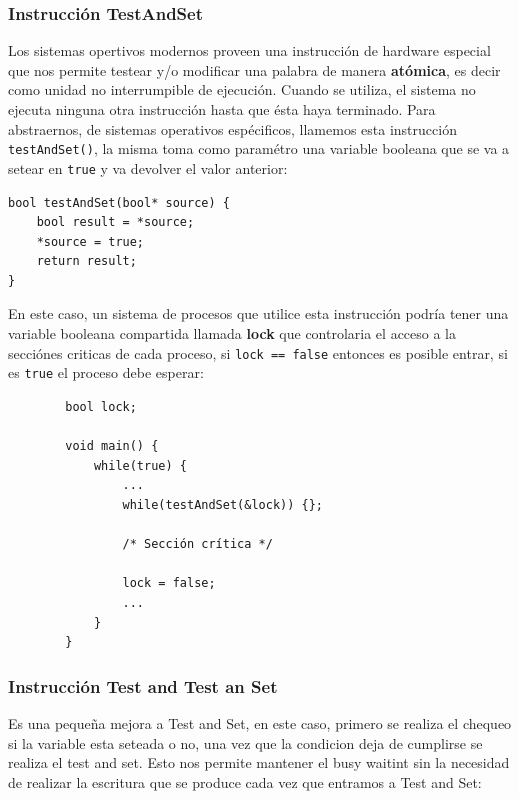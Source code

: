 \subsubsection{Instrucción TestAndSet}
Los sistemas opertivos modernos proveen una instrucción de hardware especial que nos permite testear y/o modificar una palabra de manera \textbf{atómica}, es decir como unidad no interrumpible de ejecución. Cuando se utiliza, el sistema no ejecuta ninguna otra instrucción hasta que ésta haya terminado. Para abstraernos, de sistemas operativos espécificos, llamemos esta instrucción \texttt{testAndSet()}, la misma toma como paramétro una variable booleana que se va a setear en \texttt{true} y va devolver el valor anterior:

\begin{center}
    \begin{minipage}{0.5\textwidth}
        \begin{verbatim}
bool testAndSet(bool* source) {
    bool result = *source;
    *source = true;
    return result;
}
        \end{verbatim}
    \end{minipage}
\end{center}

En este caso, un sistema de procesos que utilice esta instrucción podría tener una variable booleana compartida llamada \textbf{lock} que controlaria el acceso a la secciónes criticas de cada proceso, si \texttt{lock == false} entonces es posible entrar, si es \texttt{true} el proceso debe esperar:

\begin{verbatim}
        bool lock;
        
        void main() {
            while(true) {
                ...
                while(testAndSet(&lock)) {};
        
                /* Sección crítica */
        
                lock = false;
                ...
            }	
        }
\end{verbatim}

\subsubsection{Instrucción Test and Test an Set}
Es una pequeña mejora a Test and Set, en este caso, primero se realiza el chequeo si la variable esta seteada o no, una vez que la condicion deja de cumplirse se realiza el test and set. Esto nos permite mantener el busy waitint sin la necesidad de realizar la escritura que se produce cada vez que entramos a Test and Set:

